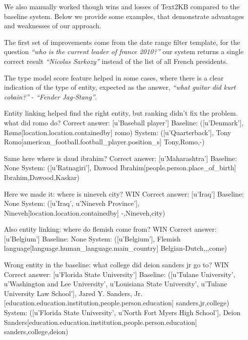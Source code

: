 


We also manually worked though wins and losses of Text2KB compared to the baseline system.
Below we provide some examples, that demonstrate advantages and weaknesses of our approach.

The first set of improvements come from the date range filter template, \eg for the question \textit{``who is the current leader of france 2010?''} our system returns a single correct result \textit{``Nicolas Sarkozy''} instead of the list of all French presidents.

The type model score feature helped in some cases, where there is a clear indication of the type of entity, expected as the answer, \eg \textit{``what guitar did kurt cobain?''} - \textit{``Fender Jag-Stang''}.

Entity linking helped find the right entity, but ranking didn't fix the problem.
what did romo do? 
Correct answer:  [u'Baseball player']
Baseline:  ([u'Denmark'], Rømø[location.location.containedby] romo)
System:  ([u'Quarterback'], Tony Romo[american\_football.football\_player.position\_s] Tony,Romo,-)

Same here
where is daud ibrahim? 
Correct answer:  [u'Maharashtra']
Baseline:  None
System:  ([u'Ratnagiri'], Dawood Ibrahim[people.person.place\_of\_birth] Ibrahim,Dawood,Kaskar)


Here we made it:
where is nineveh city? WIN
Correct answer:  [u'Iraq']
Baseline:  None
System:  ([u'Iraq', u'Nineveh Province'], Nineveh[location.location.containedby] -,Nineveh,city)

Also entity linking:
where do flemish come from? WIN
Correct answer:  [u'Belgium']
Baseline:  None
System:  ([u'Belgium'], Flemish language[language.human\_language.main\_country] Belgian-Dutch,,,come)

Wrong entity in the baseline:
what college did deion sanders jr go to? WIN
Correct answer:  [u'Florida State University']
Baseline:  ([u'Tulane University', u'Washington and Lee University', u'Louisiana State University', u'Tulane University Law School'], Jared Y. Sanders, Jr.[education.education.institution,people.person.education] sanders,jr,college)
System:  ([u'Florida State University', u'North Fort Myers High School'], Deion Sanders[education.education.institution,people.person.education] sanders,college,deion)

